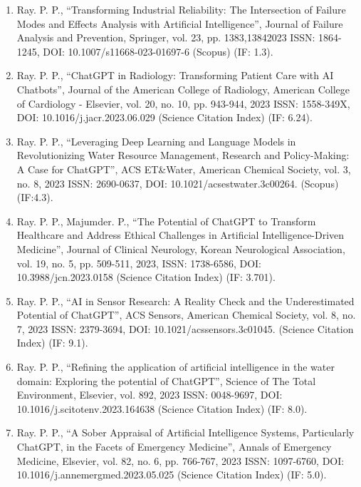 \documentclass[11pt,a4paper]{moderncv}
\begin{document}
\begin{adjustwidth}{6em}{0pt}
\begin{enumerate}
		\item Ray. P. P., “Transforming Industrial Reliability: The Intersection of Failure Modes and Effects Analysis with Artificial Intelligence”, Journal of Failure Analysis and Prevention, Springer, vol. 23, pp. 1383,13842023 ISSN: 1864-1245, DOI: 10.1007/s11668-023-01697-6 (Scopus) (IF: 1.3). 
		
		\item Ray. P. P., “ChatGPT in Radiology: Transforming Patient Care with AI Chatbots”, Journal of the American College of Radiology, American College of Cardiology - Elsevier, vol. 20, no. 10, pp. 943-944, 2023 ISSN: 1558-349X, DOI: 10.1016/j.jacr.2023.06.029 (Science Citation Index) (IF: 6.24). 
		
		\item Ray. P. P., “Leveraging Deep Learning and Language Models in Revolutionizing Water Resource Management, Research and Policy-Making: A Case for ChatGPT”, ACS ET\&Water, American Chemical Society, vol. 3, no. 8, 2023 ISSN: 2690-0637, DOI: 10.1021/acsestwater.3c00264. (Scopus) (IF:4.3). 
		
		\item Ray. P. P., Majumder. P., “The Potential of ChatGPT to Transform Healthcare and Address Ethical Challenges in Artificial Intelligence-Driven Medicine”, Journal of Clinical Neurology, Korean Neurological Association, vol. 19, no. 5, pp. 509-511, 2023, ISSN: 1738-6586, DOI: 10.3988/jcn.2023.0158 (Science Citation Index) (IF: 3.701). 
		
		\item Ray. P. P., “AI in Sensor Research: A Reality Check and the Underestimated Potential of ChatGPT”, ACS Sensors, American Chemical Society, vol. 8, no. 7, 2023 ISSN: 2379-3694, DOI: 10.1021/acssensors.3c01045. (Science Citation Index) (IF: 9.1). 
		
		\item Ray. P. P., “Refining the application of artificial intelligence in the water domain: Exploring the potential of ChatGPT”, Science of The Total Environment, Elsevier, vol. 892, 2023 ISSN: 0048-9697, DOI: 10.1016/j.scitotenv.2023.164638 (Science Citation Index) (IF: 8.0). 
		
		\item Ray. P. P., “A Sober Appraisal of Artificial Intelligence Systems, Particularly ChatGPT, in the Facets of Emergency Medicine”, Annals of Emergency Medicine, Elsevier, vol. 82, no. 6, pp. 766-767, 2023 ISSN: 1097-6760, DOI: 10.1016/j.annemergmed.2023.05.025 (Science Citation Index) (IF: 5.0). 
		

\end{enumerate}
\end{adjustwidth}
\end{document}
